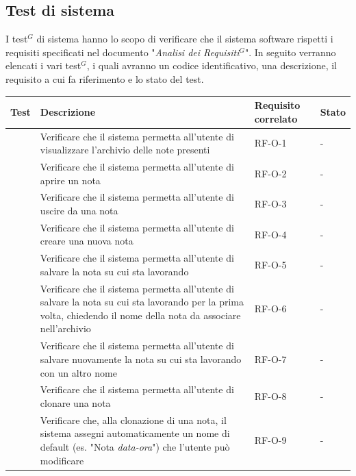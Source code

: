 \documentclass[a4paper,10pt]{article}
\begin{document}
\subsection{Test di sistema}
I test$^G$ di sistema hanno lo scopo di verificare che il sistema software rispetti i requisiti specificati nel documento "\textit{Analisi dei Requisiti$^G$}". In seguito verranno elencati i vari test$^G$, i quali avranno un codice identificativo, una descrizione, il requisito a cui fa riferimento e lo stato del test. \\


\newcommand{\testS}{%
    \stepcounter{TS@}%
    \noindent{TS-\arabic{TS@}}\quad\par
}

\begin{longtable}{|l|p{8cm}|p{2cm}|p{1.5cm}|}
    \hline
    \textbf{Test} & \textbf{Descrizione} & \textbf{Requisito correlato} & \textbf{Stato} \\ \hline
    \endfirsthead
    \hline
    \testS & Verificare che il sistema permetta all'utente di visualizzare l'archivio delle note presenti & RF-O-1 & - \\ \hline
    \testS & Verificare che il sistema permetta all'utente di aprire un nota & RF-O-2 & - \\ \hline
    \testS & Verificare che il sistema permetta all'utente di uscire da una nota & RF-O-3 & - \\ \hline
    \testS & Verificare che il sistema permetta all'utente di creare una nuova nota & RF-O-4 & - \\ \hline
    \testS & Verificare che il sistema permetta all'utente di salvare la nota su cui sta lavorando & RF-O-5 & - \\ \hline
    \testS & Verificare che il sistema permetta all'utente di salvare la nota su cui sta lavorando per la prima volta, chiedendo il nome della nota da associare nell'archivio & RF-O-6 & - \\ \hline
    \testS & Verificare che il sistema permetta all'utente di salvare nuovamente la nota su cui sta lavorando con un altro nome & RF-O-7 & - \\ \hline
    \testS & Verificare che il sistema permetta all'utente di clonare una nota & RF-O-8 & - \\ \hline
    \testS & Verificare che, alla clonazione di una nota, il sistema assegni automaticamente un nome di default (es. "Nota \textit{data-ora}") che l’utente può modificare & RF-O-9 & - \\ \hline

\end{longtable}
\end{document}
